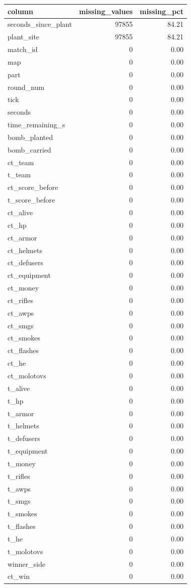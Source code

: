 \documentclass[
  letterpaper,
  DIV=11,
  numbers=noendperiod]{scrartcl}
\newcounter{none} %
\begin{document}
{\def\LTcaptype{none} %
\begin{longtable}[]{@{}lrr@{}}
\toprule\noalign{}
column & missing\_values & missing\_pct \\
\midrule\noalign{}
\endhead
\bottomrule\noalign{}
\endlastfoot
seconds\_since\_plant & 97855 & 84.21 \\
plant\_site & 97855 & 84.21 \\
match\_id & 0 & 0.00 \\
map & 0 & 0.00 \\
part & 0 & 0.00 \\
round\_num & 0 & 0.00 \\
tick & 0 & 0.00 \\
seconds & 0 & 0.00 \\
time\_remaining\_s & 0 & 0.00 \\
bomb\_planted & 0 & 0.00 \\
bomb\_carried & 0 & 0.00 \\
ct\_team & 0 & 0.00 \\
t\_team & 0 & 0.00 \\
ct\_score\_before & 0 & 0.00 \\
t\_score\_before & 0 & 0.00 \\
ct\_alive & 0 & 0.00 \\
ct\_hp & 0 & 0.00 \\
ct\_armor & 0 & 0.00 \\
ct\_helmets & 0 & 0.00 \\
ct\_defusers & 0 & 0.00 \\
ct\_equipment & 0 & 0.00 \\
ct\_money & 0 & 0.00 \\
ct\_rifles & 0 & 0.00 \\
ct\_awps & 0 & 0.00 \\
ct\_smgs & 0 & 0.00 \\
ct\_smokes & 0 & 0.00 \\
ct\_flashes & 0 & 0.00 \\
ct\_he & 0 & 0.00 \\
ct\_molotovs & 0 & 0.00 \\
t\_alive & 0 & 0.00 \\
t\_hp & 0 & 0.00 \\
t\_armor & 0 & 0.00 \\
t\_helmets & 0 & 0.00 \\
t\_defusers & 0 & 0.00 \\
t\_equipment & 0 & 0.00 \\
t\_money & 0 & 0.00 \\
t\_rifles & 0 & 0.00 \\
t\_awps & 0 & 0.00 \\
t\_smgs & 0 & 0.00 \\
t\_smokes & 0 & 0.00 \\
t\_flashes & 0 & 0.00 \\
t\_he & 0 & 0.00 \\
t\_molotovs & 0 & 0.00 \\
winner\_side & 0 & 0.00 \\
ct\_win & 0 & 0.00 \\
\end{longtable}
}
\end{document}
